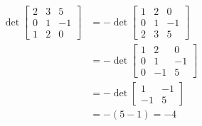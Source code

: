 \begin{applicationActivities}{2}{26}
\begin{observation}
\begin{align*}
  \det \begin{bmatrix} 2 & 3 & 5  \\ 0 & 1 & -1  \\ 1 & 2 & 0  \end{bmatrix}
&=
  -\det \begin{bmatrix} 1 & 2 & 0  \\ 0 & 1 & -1  \\ 2 & 3 & 5  \end{bmatrix}
\\ &=
  -\det \begin{bmatrix} 1 & 2 & 0  \\ 0 & 1 & -1  \\ 0 & -1 & 5  \end{bmatrix}
\\ &=
  -\det \begin{bmatrix} 1 & -1  \\ -1 & 5  \end{bmatrix}
\\ &=
  -(5-1)=-4
\end{align*}
\end{observation}

\end{applicationActivities}
